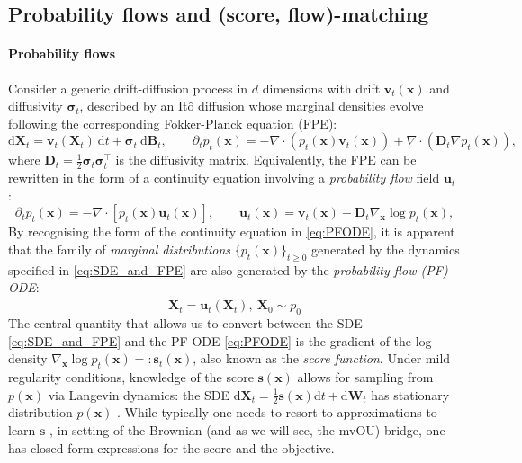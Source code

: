 \documentclass{article}
\newcommand{\diff}{\mathrm{d}}
\theoremstyle{newstyle}
\begin{document}
\subsection{Probability flows and (score, flow)-matching}\label{sec:prob_flows_matching}

\paragraph{Probability flows}
Consider a generic drift-diffusion process in $d$ dimensions with drift $\bm{v}_t(\bm{x})$ and diffusivity $\bm{\sigma}_t$, described by an It\^o diffusion whose marginal densities evolve following the corresponding Fokker-Planck equation (FPE):
\begin{equation}
  \diff \bm{X}_t = \bm{v}_t(\bm{X}_t)\:\diff t + \bm{\sigma}_t \:\diff \bm{B}_t, \qquad 
  \partial_t p_t(\bm{x}) = - \nabla \cdot ( p_t(\bm{x}) \bm{v}_t(\bm{x}) ) + \nabla \cdot \left( \bm{D}_t \nabla p_t(\bm{x}) \right), \label{eq:SDE_and_FPE}
\end{equation}
where $\bm{D}_t = \frac{1}{2} \bm{\sigma}_t \bm{\sigma}_t^\top$ is the diffusivity matrix. Equivalently, the FPE can be rewritten in the form of a continuity equation involving a \emph{probability flow} field $\bm{u}_t$ \cite{lipman2022flow, albergo2022building, albergo2023stochastic, tong2023simulation, maddu2024inferring}: 
\begin{equation}
  \partial_t p_t(\bm{x}) = -\nabla \cdot \left[ p_t(\bm{x}) \bm{u}_t(\bm{x}) \right], \qquad \bm{u}_t(\bm{x}) = \bm{v}_t(\bm{x}) - \bm{D}_t \nabla_{\bm{x}} \log p_t(\bm{x}),  \label{eq:PFODE}
\end{equation}
By recognising the form of the continuity equation in \eqref{eq:PFODE}, it is apparent that the family of \emph{marginal distributions} $\{ p_t(\bm{x}) \}_{t \ge 0}$ generated by the dynamics specified in \eqref{eq:SDE_and_FPE} are also generated by the \emph{probability flow (PF)-ODE}: 
\begin{equation}
  \dot{\bm{X}}_t = \bm{u}_t(\bm{X}_t), \: \bm{X}_0 \sim p_0
\end{equation}
The central quantity that allows us to convert between the SDE \eqref{eq:SDE_and_FPE} and the PF-ODE \eqref{eq:PFODE} is the gradient of the log-density $\nabla_{\bm{x}} \log p_t(\bm{x}) =: \bm{s}_t(\bm{x})$, also known as the \emph{score function}. Under mild regularity conditions, knowledge of the score $\bm{s}(\bm{x})$ allows for sampling from $p(\bm{x})$ via Langevin dynamics: the SDE $\diff \bm{X}_t = \frac{1}{2} \bm{s}(\bm{x}) \diff t + \diff \bm{W}_t$ has stationary distribution $p(\bm{x})$ \cite{song2019generative}.
While typically one needs to resort to  approximations to learn $\bm{s}$ \cite{vincent2011connection, song2019generative, song2020sliced}, in setting of the Brownian (and as we will see, the mvOU) bridge, one has closed form expressions for the score and the objective. 
\end{document}
